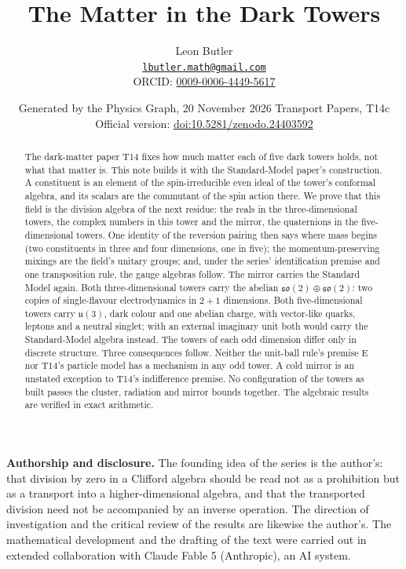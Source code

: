 \documentclass[11pt]{article}
\title{\bfseries The Matter in the Dark Towers}
\author{Leon Butler\\ \normalsize\href{mailto:lbutler.math@gmail.com}{\texttt{lbutler.math@gmail.com}}\\ \normalsize ORCID: \href{https://orcid.org/0009-0006-4449-5617}{0009-0006-4449-5617}}
\date{Generated by the Physics Graph, 20 November 2026 \textperiodcentered{} Transport Papers, T14c\\[3pt]\small Official version: \href{https://doi.org/10.5281/zenodo.24403592}{doi:10.5281/zenodo.24403592}}
\theoremstyle{definition}
\theoremstyle{plain}
\providecommand{\so}{}\renewcommand{\so}{\mathfrak{so}}
\providecommand{\uu}{}\renewcommand{\uu}{\mathfrak{u}}
\begin{document}
\maketitle
\begin{abstract}
\normalsize
The dark-matter paper T14 fixes how much matter each of five dark towers holds, not what that matter is. This note builds it with the Standard-Model paper's construction. A constituent is an element of the spin-irreducible even ideal of the tower's conformal algebra, and its scalars are the commutant of the spin action there. We prove that this field is the division algebra of the next residue: the reals in the three-dimensional towers, the complex numbers in this tower and the mirror, the quaternions in the five-dimensional towers. One identity of the reversion pairing then says where mass begins (two constituents in three and four dimensions, one in five); the momentum-preserving mixings are the field's unitary groups; and, under the series' identification premise and one transposition rule, the gauge algebras follow. The mirror carries the Standard Model again. Both three-dimensional towers carry the abelian $\so(2) \oplus \so(2)$: two copies of single-flavour electrodynamics in $2+1$ dimensions. Both five-dimensional towers carry $\uu(3)$, dark colour and one abelian charge, with vector-like quarks, leptons and a neutral singlet; with an external imaginary unit both would carry the Standard-Model algebra instead. The towers of each odd dimension differ only in discrete structure. Three consequences follow. Neither the unit-ball rule's premise E nor T14's particle model has a mechanism in any odd tower. A cold mirror is an unstated exception to T14's indifference premise. No configuration of the towers as built passes the cluster, radiation and mirror bounds together. The algebraic results are verified in exact arithmetic.
\end{abstract}
\newpage
\noindent \textbf{Authorship and disclosure. }The founding idea of the series is the author's: that division by zero in a Clifford algebra should be read not as a prohibition but as a transport into a higher-dimensional algebra, and that the transported division need not be accompanied by an inverse operation. The direction of investigation and the critical review of the results are likewise the author's. The mathematical development and the drafting of the text were carried out in extended collaboration with Claude Fable 5 (Anthropic), an AI system.
\end{document}
